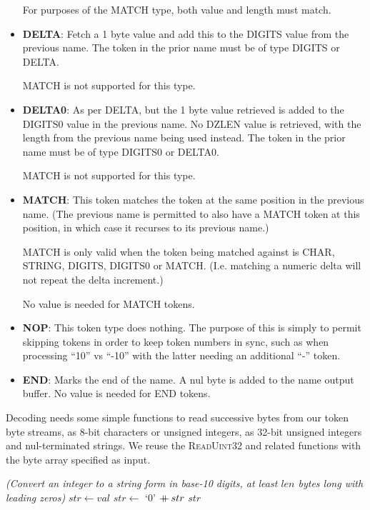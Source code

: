\documentclass[a4paper]{article}
\begin{document}
\begin{itemize}
For purposes of the MATCH type, both value and length must match.

\item{\textbf{DELTA}:}
Fetch a 1 byte value and add this to the DIGITS value from the
previous name.
The token in the prior name must be of type DIGITS or DELTA.

MATCH is not supported for this type.

\item{\textbf{DELTA0}:}
As per DELTA, but the 1 byte value retrieved is added to the DIGITS0
value in the previous name.  No DZLEN value is retrieved, with the
length from the previous name being used instead.
The token in the prior name must be of type DIGITS0 or DELTA0.

MATCH is not supported for this type.

\item{\textbf{MATCH}:}
This token matches the token at the same position in the previous
name.  (The previous name is permitted to also have a MATCH token at
this position, in which case it recurses to its previous name.)

MATCH is only valid when the token being matched against is CHAR,
STRING, DIGITS, DIGITS0 or MATCH.  (I.e. matching a numeric delta will not
repeat the delta increment.)

No value is needed for MATCH tokens.

\item{\textbf{NOP}:}
This token type does nothing.
The purpose of this is simply to permit skipping tokens in order to
keep token numbers in sync, such as when processing ``10'' vs ``-10''
with the latter needing an additional ``-'' token.

\item{\textbf{END}:}
Marks the end of the name.  A nul byte is added to the name output
buffer.  No value is needed for END tokens.
\end{itemize}

Decoding needs some simple functions to read successive bytes from our token byte streams, as 8-bit characters or unsigned integers, as 32-bit unsigned integers and nul-terminated strings.  We reuse the \textsc{ReadUint32} and related functions with the byte array specified as input.

\begin{algorithmic}[1]
\Statex
\Statex \textit{(Convert an integer to a string form in base-10 digits, at least $len$ bytes long with leading zeros)}
  \State $str \gets val$ 
    \State $str \gets$ `$0$' $ \mathbin{+\mkern-10mu+\,} str$
  \EndWhile
  \State \Return $str$
\EndFunction
\end{algorithmic}
\end{document}
